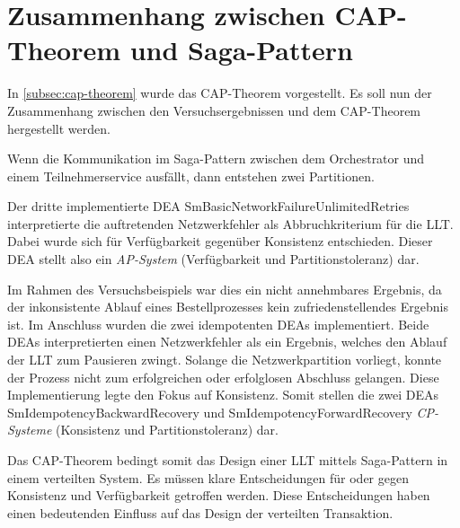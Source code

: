 \section{Zusammenhang zwischen CAP-Theorem und Saga-Pattern}
In \cref{subsec:cap-theorem} wurde das CAP-Theorem vorgestellt. Es soll nun der Zusammenhang zwischen den Versuchsergebnissen und dem CAP-Theorem hergestellt werden. 

Wenn die Kommunikation im Saga-Pattern zwischen dem Orchestrator und einem Teilnehmerservice ausfällt, dann entstehen zwei Partitionen. 

Der dritte implementierte DEA SmBasicNetworkFailureUnlimitedRetries interpretierte die auftretenden Netzwerkfehler als Abbruchkriterium für die LLT. Dabei wurde sich für Verfügbarkeit gegenüber Konsistenz entschieden. Dieser DEA stellt also ein \textit{AP-System} (Verfügbarkeit und Partitionstoleranz) dar. 

Im Rahmen des Versuchsbeispiels war dies ein nicht annehmbares Ergebnis, da der inkonsistente Ablauf eines Bestellprozesses kein zufriedenstellendes Ergebnis ist. Im Anschluss wurden die zwei idempotenten DEAs implementiert. Beide DEAs interpretierten einen Netzwerkfehler als ein Ergebnis, welches den Ablauf der LLT zum Pausieren zwingt. Solange die Netzwerkpartition vorliegt, konnte der Prozess nicht zum erfolgreichen oder erfolglosen Abschluss gelangen. Diese Implementierung legte den Fokus auf Konsistenz. Somit stellen die zwei DEAs SmIdempotencyBackwardRecovery und SmIdempotencyForwardRecovery \textit{CP-Systeme} (Konsistenz und Partitionstoleranz) dar. 

Das CAP-Theorem bedingt somit das Design einer LLT mittels Saga-Pattern in einem verteilten System. Es müssen klare Entscheidungen für oder gegen Konsistenz und Verfügbarkeit getroffen werden. Diese Entscheidungen haben einen bedeutenden Einfluss auf das Design der verteilten Transaktion.